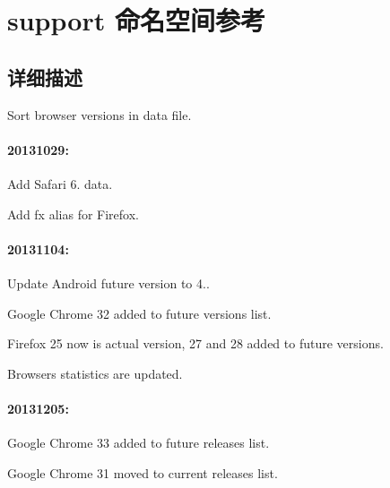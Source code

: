 \hypertarget{namespacesupport}{}\section{support 命名空间参考}
\label{namespacesupport}


\subsection{详细描述}

\begin{DoxyItemize}
\item Sort browser versions in data file.
\end{DoxyItemize}

\paragraph*{20131029\+:}


\begin{DoxyItemize}
\item Add Safari 6. data.
\item Add fx alias for Firefox.
\end{DoxyItemize}

\paragraph*{20131104\+:}


\begin{DoxyItemize}
\item Update Android future version to 4..
\item Google Chrome 32 added to future versions list.
\item Firefox 25 now is actual version, 27 and 28 added to future versions.
\item Browsers statistics are updated.
\end{DoxyItemize}

\paragraph*{20131205\+:}


\begin{DoxyItemize}
\item Google Chrome 33 added to future releases list.
\item Google Chrome 31 moved to current releases list.
\end{DoxyItemize}

